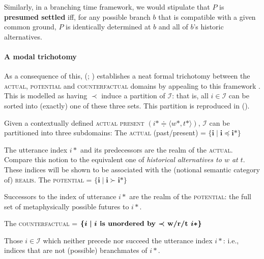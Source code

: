 \documentclass[11pt,dvipsnames]{report}
\begin{document}
\xe

\noindent Similarly, in a branching time framework, we would stipulate that $ P $ is \textbf{presumed settled} iff, for any possible branch $ b $ that is compatible with a given common ground, $ P $ is identically determined at $ b $ and all of $ b $'s historic alternatives.



\paragraph{A modal trichotomy}\label{vP-trich} As a consequence of this,  \citeauthor{VonPrince2017a} (\citeyear{VonPrince2017a,VonPrince2019}; \citealp{VonPrincea}) establishes a neat formal trichotomy between the \textsc{actual, potential} and \textsc{counterfactual} domains by appealing to this framework \citetext{\citealp[see also][41]{Rumberg2016a}, \citeyear{Rumberg2019}}. This is modelled as having $ \boldsymbol{\prec} $ induce a partition of $ \mathcal I $: that is, all $ i\in\mathcal I $ can be sorted into (exactly) one of these three sets. This partition is reproduced in ().

\pex Given a contextually defined \textsc{actual present} $( i*\doteqdot\langle w*,t*\rangle )$, $ \mathcal I $ can be partitioned into three subdomains:
\a The \textsc{actual} (past/present) = $\boldsymbol{ \{i\mid i\preccurlyeq i*\} }$

The utterance index $ i* $ and its predecessors are the realm of the \textsc{actual}.
Compare this notion to the equivalent one of \textit{historical alternatives to $ w $ at $ t $}. These indices will be shown to be associated with the (notional semantic category of) \textsc{realis}.
\a The \textsc{potential} = $ \boldsymbol{\{i\mid i\succ i*\} }$

Successors to the index of utterance $ i* $ are the realm of the \textsc{potential}: the full set of metaphysically possible futures to $ i* $.

\a The \textsc{counterfactual} = $\boldsymbol{ \{i\mid i \textbf{ is unordered by $ \boldsymbol\prec $ w/r/t } i* \}}$

Those $ i\in\mathcal I $ which neither precede nor succeed the utterance index $ i* $: i.e., indices that are not (possible) branchmates of $ i* $.
\end{document}
